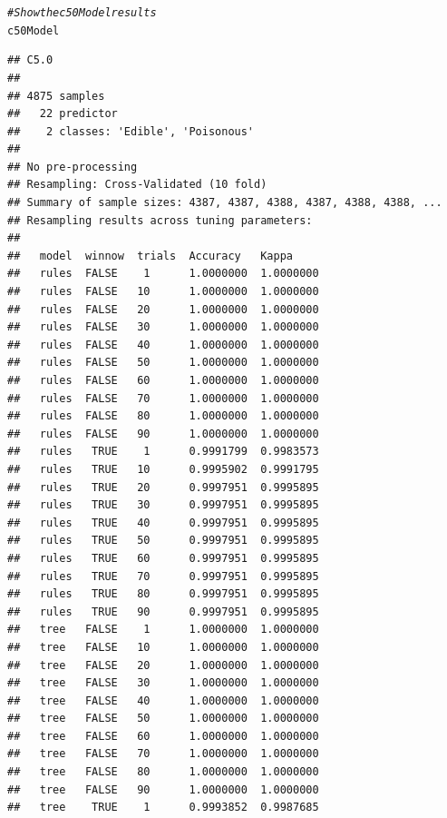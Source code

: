 \documentclass[10pt  ,usenames, dvipsnames]{article}\usepackage[]{graphicx}\usepackage[]{color}
\makeatletter
\newcommand{\hlcom}[1]{\textcolor[rgb]{0.678,0.584,0.686}{\textit{#1}}}%
\newcommand{\hlstd}[1]{\textcolor[rgb]{0.345,0.345,0.345}{#1}}%
\newenvironment{kframe}{%
 \def\at@end@of@kframe{}%
 \ifinner\ifhmode%
  \def\at@end@of@kframe{\end{minipage}}%
  \begin{minipage}{\columnwidth}%
 \fi\fi%
 \def\FrameCommand##1{\hskip\@totalleftmargin \hskip-\fboxsep
 \colorbox{shadecolor}{##1}\hskip-\fboxsep
     \hskip-\linewidth \hskip-\@totalleftmargin \hskip\columnwidth}%
 \MakeFramed {\advance\hsize-\width
   \@totalleftmargin\z@ \linewidth\hsize
   \@setminipage}}%
 {\par\unskip\endMakeFramed%
 \at@end@of@kframe}
\newenvironment{knitrout}{}{} %
\makeatother
\begin{document}
\begin{knitrout}
\color{fgcolor}\begin{kframe}
\begin{alltt}
\hlcom{#Show the c50Model results}
 \hlstd{c50Model}
\end{alltt}
\end{kframe}
\end{knitrout}




\begin{knitrout}
\color{fgcolor}\begin{kframe}
\begin{verbatim}
## C5.0 
## 
## 4875 samples
##   22 predictor
##    2 classes: 'Edible', 'Poisonous' 
## 
## No pre-processing
## Resampling: Cross-Validated (10 fold) 
## Summary of sample sizes: 4387, 4387, 4388, 4387, 4388, 4388, ... 
## Resampling results across tuning parameters:
## 
##   model  winnow  trials  Accuracy   Kappa    
##   rules  FALSE    1      1.0000000  1.0000000
##   rules  FALSE   10      1.0000000  1.0000000
##   rules  FALSE   20      1.0000000  1.0000000
##   rules  FALSE   30      1.0000000  1.0000000
##   rules  FALSE   40      1.0000000  1.0000000
##   rules  FALSE   50      1.0000000  1.0000000
##   rules  FALSE   60      1.0000000  1.0000000
##   rules  FALSE   70      1.0000000  1.0000000
##   rules  FALSE   80      1.0000000  1.0000000
##   rules  FALSE   90      1.0000000  1.0000000
##   rules   TRUE    1      0.9991799  0.9983573
##   rules   TRUE   10      0.9995902  0.9991795
##   rules   TRUE   20      0.9997951  0.9995895
##   rules   TRUE   30      0.9997951  0.9995895
##   rules   TRUE   40      0.9997951  0.9995895
##   rules   TRUE   50      0.9997951  0.9995895
##   rules   TRUE   60      0.9997951  0.9995895
##   rules   TRUE   70      0.9997951  0.9995895
##   rules   TRUE   80      0.9997951  0.9995895
##   rules   TRUE   90      0.9997951  0.9995895
##   tree   FALSE    1      1.0000000  1.0000000
##   tree   FALSE   10      1.0000000  1.0000000
##   tree   FALSE   20      1.0000000  1.0000000
##   tree   FALSE   30      1.0000000  1.0000000
##   tree   FALSE   40      1.0000000  1.0000000
##   tree   FALSE   50      1.0000000  1.0000000
##   tree   FALSE   60      1.0000000  1.0000000
##   tree   FALSE   70      1.0000000  1.0000000
##   tree   FALSE   80      1.0000000  1.0000000
##   tree   FALSE   90      1.0000000  1.0000000
##   tree    TRUE    1      0.9993852  0.9987685

\end{verbatim}
\end{kframe}
\end{knitrout}
\end{document}
